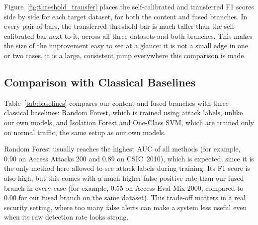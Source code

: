 \documentclass[futureinternet,article,submit,moreauthors]{Definitions/mdpi}
\begin{document}
Figure~\ref{fig:threshold_transfer} places the self-calibrated and transferred F1 scores side by side for each target dataset, for both the content and fused branches. In every pair of bars, the transferred-threshold bar is much taller than the self-calibrated bar next to it, across all three datasets and both branches. This makes the size of the improvement easy to see at a glance: it is not a small edge in one or two cases, it is a large, consistent jump everywhere this comparison is made.

\subsection{Comparison with Classical Baselines} \label{sec5.5}

Table~\ref{tab:baselines} compares our content and fused branches with three classical baselines: Random Forest, which is trained using attack labels, unlike our own models, and Isolation Forest and One-Class SVM, which are trained only on normal traffic, the same setup as our own models.

Random Forest usually reaches the highest AUC of all methods (for example, 0.90 on Access Attacks 200 and 0.89 on CSIC~2010), which is expected, since it is the only method here allowed to see attack labels during training. Its F1 score is also high, but this comes with a much higher false positive rate than our fused branch in every case (for example, 0.55 on Access Eval Mix 2000, compared to 0.00 for our fused branch on the same dataset). This trade-off matters in a real security setting, where too many false alerts can make a system less useful even when its raw detection rate looks strong.
\end{document}
